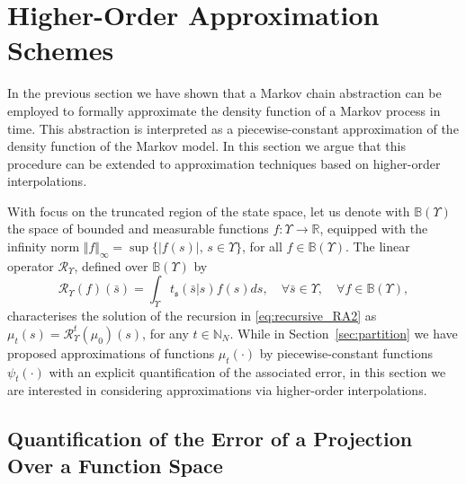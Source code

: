 \documentclass{LMCS}
\begin{document}
\section{Higher-Order Approximation Schemes}
\label{sec:approx&error}
In the previous section we have shown that a Markov chain abstraction can be employed to formally approximate the density function of a Markov process in time. 
This abstraction is interpreted as a piecewise-constant approximation of the density function of the Markov model. 
In this section we argue that this procedure can be extended to approximation techniques based on higher-order interpolations. 

With focus on the truncated region of the state space, 
let us denote with $\mathbb B(\Upsilon)$ the space of bounded and measurable functions $f:\Upsilon\rightarrow\mathbb R$,
equipped with the infinity norm
$\Vert f\Vert_{\infty} = \sup\{|f(s)|, \, s\in\Upsilon\}$, 
for all $f\in \mathbb B(\Upsilon)$. 
The linear operator $\mathcal R_\Upsilon$, defined over $\mathbb B(\Upsilon)$ by 
\begin{equation}\label{eq:operator}
\mathcal R_\Upsilon (f)(\bar s) = \int_{\Upsilon}t_{\mathfrak s}(\bar s|s)f(s)ds, 
\quad \forall \bar s\in\Upsilon,
\quad \forall f\in\mathbb B(\Upsilon),
\end{equation}
characterises the solution of the recursion in \eqref{eq:recursive_RA2} as
$\mu_t(s) = \mathcal R_\Upsilon^t(\mu_0) (s)$, for any $t\in\mathbb N_N$.
While in Section~\ref{sec:partition} we have proposed approximations of functions $\mu_t(\cdot)$ by piecewise-constant 
functions $\psi_t(\cdot)$ with an explicit quantification of the associated error, 
in this section we are interested in considering approximations via higher-order interpolations.

\subsection{Quantification of the Error of a Projection Over a Function Space}
\end{document}
